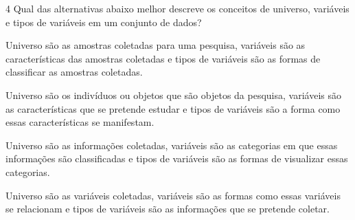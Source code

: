 

\num{4}  Qual das alternativas abaixo melhor descreve os conceitos de
universo, variáveis e tipos de variáveis em um conjunto de dados?

\begin{escolha}
\item Universo são as amostras coletadas para uma pesquisa, variáveis são
as características das amostras coletadas e tipos de variáveis são as
formas de classificar as amostras coletadas.
\item Universo são os indivíduos ou objetos que são objetos da pesquisa,
variáveis são as características que se pretende estudar e tipos de
variáveis são a forma como essas características se manifestam.
\item Universo são as informações coletadas, variáveis são as categorias em
que essas informações são classificadas e tipos de variáveis são as
formas de visualizar essas categorias.
\item Universo são as variáveis coletadas, variáveis são as formas como
essas variáveis se relacionam e tipos de variáveis são as informações
que se pretende coletar.
\end{escolha}


